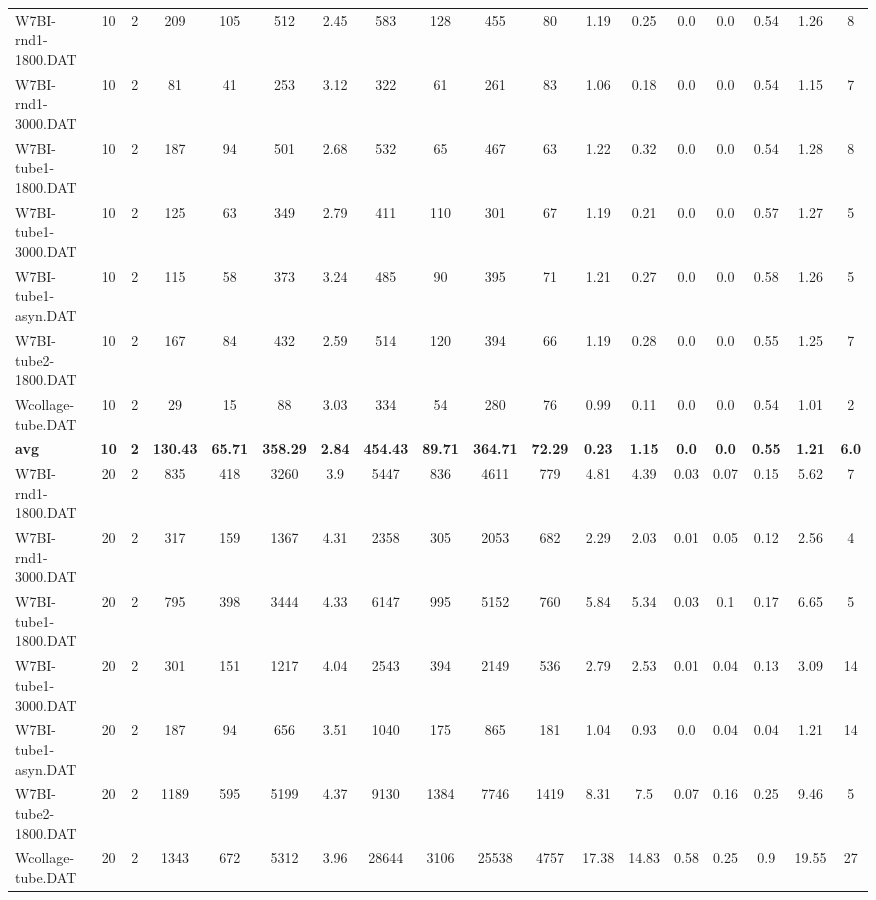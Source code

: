 \begin{sidewaystable}[h]
{\begin{tabular}{lccccccccccccccccc}
W7BI-rnd1-1800.DAT & 10 & 2 & 209 & 105 & 512 & 2.45 & 583 & 128 & 455 & 80 & 1.19 & 0.25 & 0.0 & 0.0 & 0.54 & 1.26 & 8\\
W7BI-rnd1-3000.DAT & 10 & 2 & 81 & 41 & 253 & 3.12 & 322 & 61 & 261 & 83 & 1.06 & 0.18 & 0.0 & 0.0 & 0.54 & 1.15 & 7\\
W7BI-tube1-1800.DAT & 10 & 2 & 187 & 94 & 501 & 2.68 & 532 & 65 & 467 & 63 & 1.22 & 0.32 & 0.0 & 0.0 & 0.54 & 1.28 & 8\\
W7BI-tube1-3000.DAT & 10 & 2 & 125 & 63 & 349 & 2.79 & 411 & 110 & 301 & 67 & 1.19 & 0.21 & 0.0 & 0.0 & 0.57 & 1.27 & 5\\
W7BI-tube1-asyn.DAT & 10 & 2 & 115 & 58 & 373 & 3.24 & 485 & 90 & 395 & 71 & 1.21 & 0.27 & 0.0 & 0.0 & 0.58 & 1.26 & 5\\
W7BI-tube2-1800.DAT & 10 & 2 & 167 & 84 & 432 & 2.59 & 514 & 120 & 394 & 66 & 1.19 & 0.28 & 0.0 & 0.0 & 0.55 & 1.25 & 7\\
Wcollage-tube.DAT & 10 & 2 & 29 & 15 & 88 & 3.03 & 334 & 54 & 280 & 76 & 0.99 & 0.11 & 0.0 & 0.0 & 0.54 & 1.01 & 2\\
\cline{1-18} \textbf{avg} & \textbf{10} & \textbf{2} & \textbf{130.43} & \textbf{65.71} & \textbf{358.29} & \textbf{2.84} & \textbf{454.43} & \textbf{89.71} & \textbf{364.71} & \textbf{72.29} & \textbf{0.23} & \textbf{1.15} & \textbf{0.0} & \textbf{0.0} & \textbf{0.55} & \textbf{1.21} & \textbf{6.0} \\ \cline{1-18}
W7BI-rnd1-1800.DAT & 20 & 2 & 835 & 418 & 3260 & 3.9 & 5447 & 836 & 4611 & 779 & 4.81 & 4.39 & 0.03 & 0.07 & 0.15 & 5.62 & 7\\
W7BI-rnd1-3000.DAT & 20 & 2 & 317 & 159 & 1367 & 4.31 & 2358 & 305 & 2053 & 682 & 2.29 & 2.03 & 0.01 & 0.05 & 0.12 & 2.56 & 4\\
W7BI-tube1-1800.DAT & 20 & 2 & 795 & 398 & 3444 & 4.33 & 6147 & 995 & 5152 & 760 & 5.84 & 5.34 & 0.03 & 0.1 & 0.17 & 6.65 & 5\\
W7BI-tube1-3000.DAT & 20 & 2 & 301 & 151 & 1217 & 4.04 & 2543 & 394 & 2149 & 536 & 2.79 & 2.53 & 0.01 & 0.04 & 0.13 & 3.09 & 14\\
W7BI-tube1-asyn.DAT & 20 & 2 & 187 & 94 & 656 & 3.51 & 1040 & 175 & 865 & 181 & 1.04 & 0.93 & 0.0 & 0.04 & 0.04 & 1.21 & 14\\
W7BI-tube2-1800.DAT & 20 & 2 & 1189 & 595 & 5199 & 4.37 & 9130 & 1384 & 7746 & 1419 & 8.31 & 7.5 & 0.07 & 0.16 & 0.25 & 9.46 & 5\\
Wcollage-tube.DAT & 20 & 2 & 1343 & 672 & 5312 & 3.96 & 28644 & 3106 & 25538 & 4757 & 17.38 & 14.83 & 0.58 & 0.25 & 0.9 & 19.55 & 27\\

\end{tabular}}
\end{sidewaystable}
